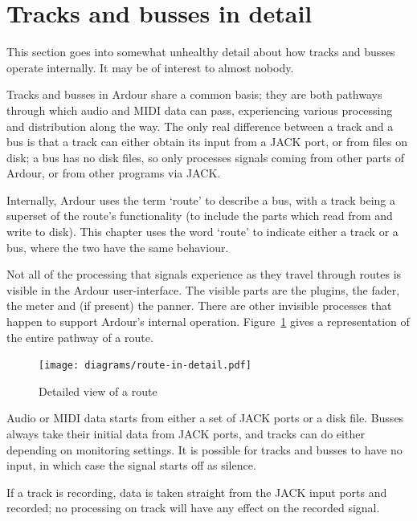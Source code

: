 \documentclass[10pt,a4paper]{book}
\begin{document}
{\section{Tracks and busses in detail}

\begin{ddanger}
This section goes into somewhat unhealthy detail about how tracks and
busses operate internally.  It may be of interest to almost nobody.
\end{ddanger}

Tracks and busses in Ardour share a common basis; they are both
pathways through which audio and MIDI data can pass, experiencing
various processing and distribution along the way.  The only real
difference between a track and a bus is that a track can either obtain
its input from a JACK port, or from files on disk; a bus has no disk
files, so only processes signals coming from other parts of Ardour, or
from other programs via JACK\@.

Internally, Ardour uses the term `route' to describe a bus, with a
track being a superset of the route's functionality (to include the
parts which read from and write to disk).  This chapter uses the word
`route' to indicate either a track or a bus, where the two have the
same behaviour.

Not all of the processing that signals experience as they travel
through routes is visible in the Ardour user-interface. The visible parts
are the plugins, the fader, the meter and (if present) the panner.
There are other invisible processes that happen to support Ardour's
internal operation.  Figure~\ref{fig:route-in-detail} gives a
representation of the entire pathway of a route.

\begin{figure}[ht]
\begin{center}
\texttt{[image: diagrams/route-in-detail.pdf]}
\end{center}
\caption{Detailed view of a route}
\label{fig:route-in-detail}
\end{figure}

Audio or MIDI data starts from either a set of JACK ports or a disk
file.  Busses always take their initial data from JACK ports, and
tracks can do either depending on monitoring settings.  It is possible
for tracks and busses to have no input, in which case the signal
starts off as silence.

If a track is recording, data is taken straight from the JACK input
ports and recorded; no processing on track will have any effect on the
recorded signal.

}
\end{document}
